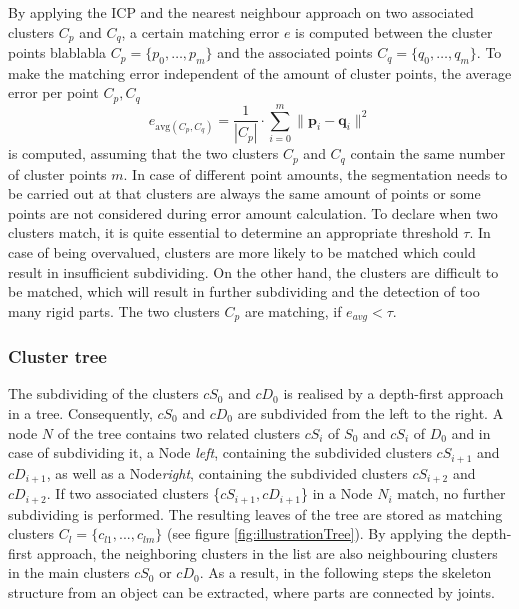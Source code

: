 \documentclass[notitlepage,english]{hgbreport}
\begin{document}
By applying the ICP and the nearest neighbour approach on two associated clusters $C_p$ and $C_q$, a certain matching error $e$ is computed between the cluster points blablabla $ C_p =  \{ p_0, \ldots, p_m\}$ and the associated points $ C_q =  \{ q_0, \ldots, q_m\}$. To make the matching error independent of the amount of cluster points, the average error per point $C_p, C_q$
%
\begin{equation}
	e_{\mathrm{avg}(C_p, C_q)} = \frac{1}{| C_p |} \cdot \displaystyle\sum_{i=0}^{m}\| \boldsymbol{p}_i - \boldsymbol{q}_i\|^2
\end{equation}
%
is computed, assuming that the two clusters $C_p$ and $C_q$ contain the same number of cluster points $m$. In case of different point amounts, the segmentation needs to be carried out at that clusters are always the same amount of points or some points are not considered during error amount calculation. To declare when two clusters match, it is quite essential to determine an appropriate threshold $\tau$. In case of being overvalued, clusters are more likely to be matched which could result in insufficient subdividing. On the other hand, the clusters are difficult to be matched, which will result in further subdividing and the detection of too many rigid parts. The two clusters $C_p$ are matching, if $e_{avg} < \tau$.

\subsubsection{Cluster tree}
\label{tree}

The subdividing of the clusters $cS_0$ and $cD_0$ is realised by a depth-first approach in a tree. Consequently, $cS_0$ and $cD_0$ are subdivided from the left to the right. A node $N$ of the tree contains two related clusters $cS_i$ of $S_0$ and $cS_i$ of $D_0$ and in case of subdividing it, a Node \textit{left}, containing the subdivided clusters $cS_{i+1}$ and $cD_{i+1}$, as well as a Node\textit{right}, containing the subdivided clusters $cS_{i+2}$ and $cD_{i+2}$. If two associated clusters \{$cS_{i+1}, cD_{i+1}$\} in a Node $N_i$ match, no further subdividing is performed. The resulting leaves of the tree are stored as matching clusters $C_l = \{{c_{l1}, ... , c_{lm}}\}$ (see figure \ref{fig:illustrationTree}). By applying the depth-first approach, the neighboring clusters in the list are also neighbouring clusters in the main clusters $cS_0$ or $cD_0$.  As a result, in the following steps the skeleton structure from an object can be extracted, where parts are connected by joints.
\end{document}
